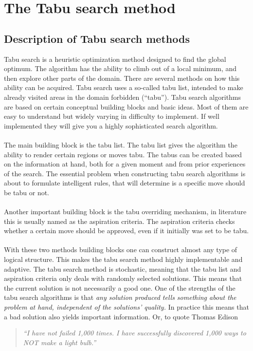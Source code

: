 \pagebreak
\section{The Tabu search method}
\subsection{Description of Tabu search methods}
Tabu search is a heuristic optimization method designed to find the global optimum. The algorithm has the ability to climb out of a local minimum, and then explore other parts of the domain. There are several methods on how this ability can be acquired. Tabu search uses a so-called tabu list, intended to make already visited areas in the domain forbidden (``tabu''). Tabu search algorithms are based on certain conceptual building blocks and basic ideas. Most of them are easy to understand but widely varying in difficulty to implement. If well implemented they will give you a highly sophisticated search algorithm. \\
\\The main building block is the tabu list. The tabu list gives the algorithm the ability to render certain regions or moves tabu. The tabus can be created based on the information at hand, both for a given moment and from prior experiences of the search. The essential problem when constructing tabu search algorithms is about to formulate intelligent rules, that will determine is a specific move should be tabu or not.\\
\\Another important building block is the tabu overriding mechanism, in literature this is usually named as the aspiration criteria. The aspiration criteria checks whether a certain move should be approved, even if it initially was set to be tabu. \\
\\With these two methods building blocks one can construct almost any type of logical structure. This makes the tabu search method highly implementable and adaptive. The tabu search method is stochastic, meaning that the tabu list and aspiration criteria only deals with randomly selected solutions. This means that the current solution is not necessarily a good one. One of the strengths of the tabu search algorithms is that \emph{any solution produced tells something about the problem at hand, independent of the solutions' quality.} In practice this means that a bad solution also yields important information.  Or, to quote Thomas Edison 
\begin{quotation}
\emph{``I have not failed 1,000 times.  I have
successfully discovered 1,000 ways to NOT make a light bulb.''}
\end{quotation}
